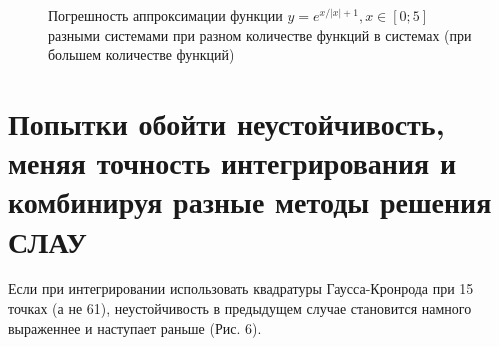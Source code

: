 ﻿\documentclass[a4paper, 12pt]{article}
\begin{document}
\begin{figure}[h!]
    \noindent{}
    \caption{Погрешность аппроксимации функции $y=e^{x/\left|x\right|+1}, x\in[0;5]$ разными системами при разном количестве функций в системах (при большем количестве функций)}
    \label{figCurves}
\end{figure}

\section{Попытки обойти неустойчивость, меняя точность интегрирования и комбинируя разные методы решения СЛАУ}

Если при интегрировании использовать квадратуры Гаусса-Кронрода при 15 точках (а не 61), неустойчивость в предыдущем случае становится намного выраженнее и наступает раньше (Рис. 6).
\end{document}
